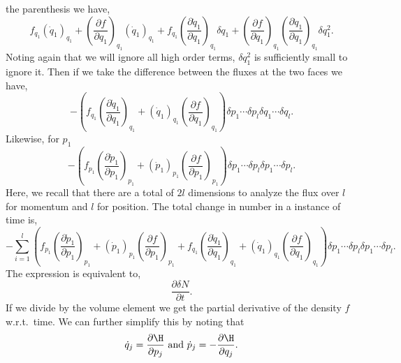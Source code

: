 the parenthesis we have,
\begin{equation*}
	f_{q_{1}}(\dot{q}_{1})_{q_{1}}
	+
	\left(\frac{\partial f}{\partial q_{1}}\right)_{q_{1}}(\dot{q}_{1})_{q_{1}}
	+
	f_{q_{1}}\left(\frac{\partial \dot{q}_{1}}{\partial q_{1}}\right)_{q_{1}}
	\delta q_{1}
	+
	\left(\frac{\partial f}{\partial q_{1}}\right)_{q_{1}}
	\left(\frac{\partial \dot{q}_{1}}{\partial q_{1}}\right)_{q_{1}}\delta
	q_{1}^{2}.
\end{equation*}
Noting again that we will ignore all high order terms, $\delta q_{1}^{2}$ is
sufficiently small to ignore it. Then if we take the difference between the
fluxes at the two faces we have,
\begin{equation*}
	-\left(f_{q_{1}}\left(\frac{\partial \dot{q}_{1}}
	{\partial q_{1}}\right)_{q_{1}} + (\dot{q}_{1})_{q_{1}}
	\left(\frac{\partial f}{\partial q_{1}}\right)_{q_{1}}\right)
	\delta p_1 \cdots \delta p_{l} \delta q_1 \cdots \delta q_{l}.
\end{equation*}
Likewise, for $p_{1}$
\begin{equation*}
	-\left(f_{p_{1}}\left(\frac{\partial \dot{p}_{1}}
	{\partial p_{1}}\right)_{p_{1}} + (\dot{p}_{1})_{p_{1}}
	\left(\frac{\partial f}{\partial p_{1}}\right)_{p_{1}}\right)
	\delta p_1 \cdots \delta p_{l} \delta p_1 \cdots \delta p_{l}.
\end{equation*}
Here, we recall that there are a total of $2l$ dimensions to analyze the flux
over $l$ for momentum and $l$ for position. The total change in number in a
instance of time is,
\begin{equation*}
	-\sum_{i=1}^{l}{\left(f_{p_{1}}\left(\frac{\partial \dot{p}_{1}} {\partial
	p_{1}}\right)_{p_{1}} + (\dot{p}_{1})_{p_{1}} \left(\frac{\partial
	f}{\partial p_{1}}\right)_{p_{1}} + f_{q_{1}}\left(\frac{\partial \dot{q}_{1}}
	{\partial q_{1}}\right)_{q_{1}} + (\dot{q}_{1})_{q_{1}}
	\left(\frac{\partial f}{\partial q_{1}}\right)_{q_{1}}\right)
	\delta p_1 \cdots \delta p_{l} \delta p_1 \cdots \delta p_{l}}.
\end{equation*}
The expression is equivalent to,
\begin{equation*}
	\frac{\partial\delta N}{\partial t}.
\end{equation*}
If we divide by the volume element we get the partial derivative of the  density
$f$ w.r.t.\ time. We can further simplify this by noting that 
\begin{equation*}
	\dot{q}_{j} = \frac{\partial\H}{\partial p_{j}} \text{ and } \dot{p}_{j} = -
	\frac{\partial\H}{\partial q_{j}}.
\end{equation*}
